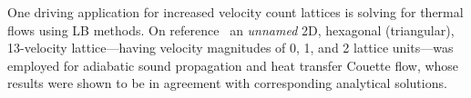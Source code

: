    One driving application for  increased  velocity  count  lattices  is  solving  for  thermal  flows  using  LB  methods.  On
    reference~\cite{1993-AlexanderFJ+SterlingJD-PhysRevE}   an   \emph{unnamed}   2D,   hexagonal   (triangular),    13-velocity
    lattice---having velocity magnitudes of 0, 1, and 2 lattice units---was employed for adiabatic sound  propagation  and  heat
    transfer Couette flow, whose results were shown to be in agreement with corresponding analytical solutions.





